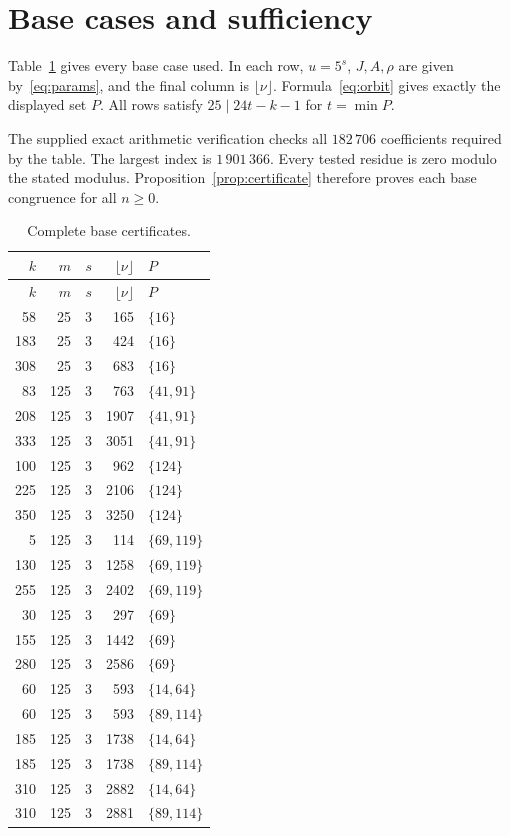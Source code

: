 \documentclass[11pt]{article}
\begin{document}
\section{Base cases and sufficiency}
Table~\ref{tab:certs} gives every base case used. In each row, $u=5^s$, $J,A,\rho$ are given by~\eqref{eq:params}, and the final column is $\lfloor\nu\rfloor$. Formula~\eqref{eq:orbit} gives exactly the displayed set $P$. All rows satisfy $25\mid24t-k-1$ for $t=\min P$.

The supplied exact arithmetic verification checks all $182\,706$ coefficients required by the table. The largest index is $1\,901\,366$. Every tested residue is zero modulo the stated modulus. Proposition~\ref{prop:certificate} therefore proves each base congruence for all $n\ge0$.

\begin{longtable}{rrrrl}
\caption{Complete base certificates.}\label{tab:certs}\\
\toprule
$k$&$m$&$s$&$\lfloor\nu\rfloor$&$P$\\\midrule\endfirsthead
\toprule $k$&$m$&$s$&$\lfloor\nu\rfloor$&$P$\\\midrule\endhead
58&25&3&165&$\{16\}$\\
183&25&3&424&$\{16\}$\\
308&25&3&683&$\{16\}$\\
83&125&3&763&$\{41,91\}$\\
208&125&3&1907&$\{41,91\}$\\
333&125&3&3051&$\{41,91\}$\\
100&125&3&962&$\{124\}$\\
225&125&3&2106&$\{124\}$\\
350&125&3&3250&$\{124\}$\\
5&125&3&114&$\{69,119\}$\\
130&125&3&1258&$\{69,119\}$\\
255&125&3&2402&$\{69,119\}$\\
30&125&3&297&$\{69\}$\\
155&125&3&1442&$\{69\}$\\
280&125&3&2586&$\{69\}$\\
60&125&3&593&$\{14,64\}$\\
60&125&3&593&$\{89,114\}$\\
185&125&3&1738&$\{14,64\}$\\
185&125&3&1738&$\{89,114\}$\\
310&125&3&2882&$\{14,64\}$\\
310&125&3&2881&$\{89,114\}$\\

\end{longtable}
\end{document}
